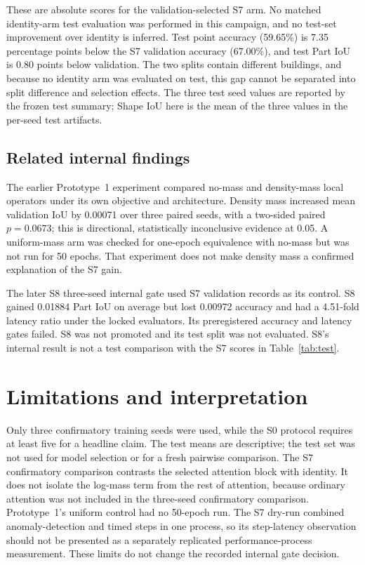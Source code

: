 \documentclass[11pt,a4paper]{article}
\begin{document}
These are absolute scores for the validation-selected S7 arm. No matched identity-arm test evaluation was performed in this campaign, and no test-set improvement over identity is inferred. Test point accuracy (59.65\%) is 7.35 percentage points below the S7 validation accuracy (67.00\%), and test Part IoU is 0.80 points below validation. The two splits contain different buildings, and because no identity arm was evaluated on test, this gap cannot be separated into split difference and selection effects. The three test seed values are reported by the frozen test summary; Shape IoU here is the mean of the three values in the per-seed test artifacts.

\subsection{Related internal findings}

The earlier Prototype~1 experiment compared no-mass and density-mass local operators under its own objective and architecture. Density mass increased mean validation IoU by 0.00071 over three paired seeds, with a two-sided paired $p=0.0673$; this is directional, statistically inconclusive evidence at 0.05. A uniform-mass arm was checked for one-epoch equivalence with no-mass but was not run for 50 epochs. That experiment does not make density mass a confirmed explanation of the S7 gain.

The later S8 three-seed internal gate used S7 validation records as its control. S8 gained 0.01884 Part IoU on average but lost 0.00972 accuracy and had a 4.51-fold latency ratio under the locked evaluators. Its preregistered accuracy and latency gates failed. S8 was not promoted and its test split was not evaluated. S8's internal result is not a test comparison with the S7 scores in Table~\ref{tab:test}.

\section{Limitations and interpretation}

Only three confirmatory training seeds were used, while the S0 protocol requires at least five for a headline claim. The test means are descriptive; the test set was not used for model selection or for a fresh pairwise comparison. The S7 confirmatory comparison contrasts the selected attention block with identity. It does not isolate the log-mass term from the rest of attention, because ordinary attention was not included in the three-seed confirmatory comparison. Prototype~1's uniform control had no 50-epoch run. The S7 dry-run combined anomaly-detection and timed steps in one process, so its step-latency observation should not be presented as a separately replicated performance-process measurement. These limits do not change the recorded internal gate decision.
\end{document}

